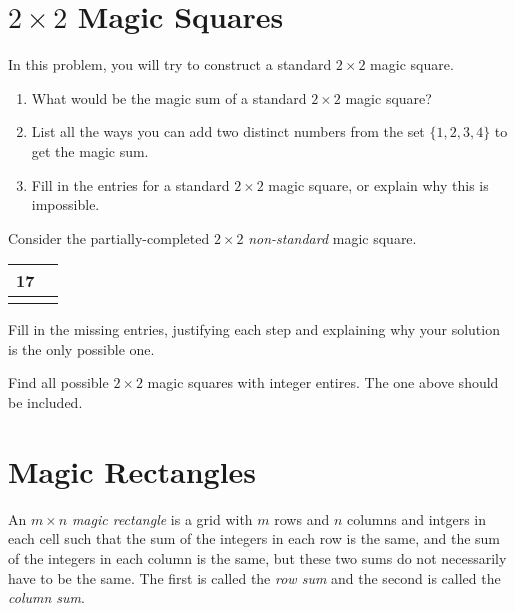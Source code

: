 \documentclass[11pt]{article}
\renewenvironment{problem}{\begin{problems}}{\end{problems}\vspace{5pt}}
\begin{document}
\section{$2 \times 2$ Magic Squares}

\begin{problem}[6=2+2+2 points]
In this problem, you will try to construct a standard $2 \times 2$ magic square.
\begin{enumerate}[label=(\alph*)]
\item What would be the magic sum of a standard $2 \times 2$ magic square?

\item List all the ways you can add two distinct numbers from the set $\{1, 2, 3, 4\}$ to get the magic sum.

\item Fill in the entries for a standard $2 \times 2$ magic square, or explain why this is impossible.
\end{enumerate}
\end{problem}

\begin{problem}[4 points]
Consider the partially-completed $2 \times 2$ \textit{non-standard} magic square.
\begin{center}
\begin{tabular}{|c|c|}
\hline
17 & \phantom{17} \\ \hline
 & \\ \hline
\end{tabular}
\end{center}
Fill in the missing entries, justifying each step and explaining why your solution is the only possible one.
\end{problem}

\begin{problem}[4 points]
Find all possible $2 \times 2$ magic squares with integer entires. The one above should be included.
\end{problem}

\section{Magic Rectangles}

\begin{definition}
An $m \times n$ \textit{magic rectangle} is a grid with $m$ rows and $n$ columns and intgers in each cell such that
the sum of the integers in each row is the same, and the sum of the integers in each column is the same,
but these two sums do not necessarily have to be the same.
The first is called the \textit{row sum} and the second is called the \textit{column sum}.
\end{definition}
\end{document}
